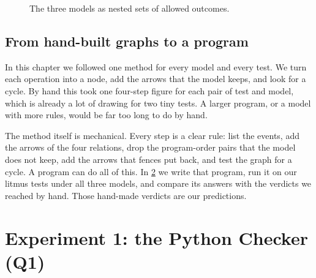\begin{figure}[H]
\centering
{}
\caption{The three models as nested sets of allowed outcomes.}
\label{fig:nested}
\end{figure}

\section{From hand-built graphs to a program}
\label{sec:towards}

In this chapter we followed one method for every model and every test. We turn each operation into a node, add the arrows that the model keeps, and look for a cycle. By hand this took one four-step figure for each pair of test and model, which is already a lot of drawing for two tiny tests. A larger program, or a model with more rules, would be far too long to do by hand.

The method itself is mechanical. Every step is a clear rule: list the events, add the arrows of the four relations, drop the program-order pairs that the model does not keep, add the arrows that fences put back, and test the graph for a cycle. A program can do all of this. In \cref{ch:checker} we write that program, run it on our litmus tests under all three models, and compare its answers with the verdicts we reached by hand. Those hand-made verdicts are our predictions.

\chapter{Experiment 1: the Python Checker (Q1)}
\label{ch:checker}


